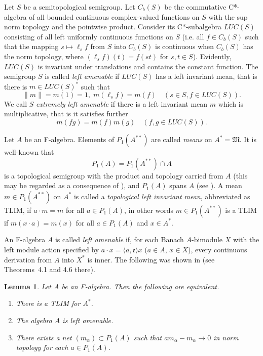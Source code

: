 \documentclass{tran-l}
\numberwithin{equation}{section}
\newtheorem{lemma}[thm]{Lemma}
\theoremstyle{definition}
\theoremstyle{remark}
\begin{document}
Let $S$ be a semitopological semigroup. Let $C_b(S)$ be the commutative C*-algebra of all bounded continuous complex-valued functions on $S$ with the sup norm topology and the pointwise product. Consider its C*-subalgebra $LUC(S)$ consisting of all left uniformly continuous functions on $S$ (i.e. all
$f\in C_b(S)$ such that the mapping $s\mapsto \ell_sf$ from $S$ into $C_b(S)$ is continuous when $C_b(S)$ has the norm topology, where $(\ell_sf)(t) = f(st)$ for $s,t\in S$). Evidently, $LUC(S)$ 
is invariant under translations and contains the constant function. The semigroup $S$ is called \emph{left amenable} if $LUC(S)$ has a left invariant mean, that is there is $m\in LUC(S)^*$ such that 
\[
\|m\| = m(1) =1,\; m(\ell_sf) = m(f) \quad (s\in S, f\in LUC(S)).
\]
We call $S$  \emph{extremely left amenable} if there is a left invariant mean $m$ which is multiplicative, that is it satisfies further
 \[
 m(fg) = m(f)m(g)\quad (f,g \in LUC(S)).
 \]

Let $A$ be an F-algebra. Elements of $P_1(A^{**})$ are called \emph{means} on $A^* ={\mathfrak{M}}$. It is well-known that 
\[
P_1(A) = P_1(A^{**})\cap A
\]
  is a topological semigroup with the product and topology carried from $A$ (this may be regarded as a consequence of \cite[Proposition~1.5.2]{Sakai}), and $P_1(A)$ spans $A$ (see \cite[Theorem~1.14.3]{Sakai}). A mean $m \in P_1(A^{**})$ on $A^*$ is called a \emph{topological left invariant mean}, abbreviated as TLIM,  if $a\cdot m = m$ for all $a\in P_1(A)$, in other words $m \in P_1(A^{**})$ is a TLIM if $m(x\cdot a) = m(x)$ for all $a\in P_1(A)$ and $x\in A^*$. 

 An F-algebra $A$ is called \emph{left amenable} if, for each Banach $A$-bimodule $X$ with the left module action specified by $a\cdot x = \langle a, {\mathfrak{e}}\rangle x$ ($a\in A$, $x\in X$), every continuous derivation from $A$ into $X^*$ is inner. The following was shown in \cite{Lau_F} (see Theorems~4.1 and 4.6 there).

\begin{lemma}\label{left amen1-3}
Let $A$ be an F-algebra. Then the following are equivalent.
\begin{enumerate}
\item There is a TLIM for $A^*$. \label{TLIM}
\item  
The algebra $A$ is left amenable.\label{inner}
\item There exists a net $(m_{\alpha})\subset P_1(A)$ such that $am_{\alpha} - m_{\alpha} \to 0$
in norm topology for each $a\in P_1(A)$.\label{appTLIM}
\end{enumerate}
\end{lemma}
 
\end{document}
